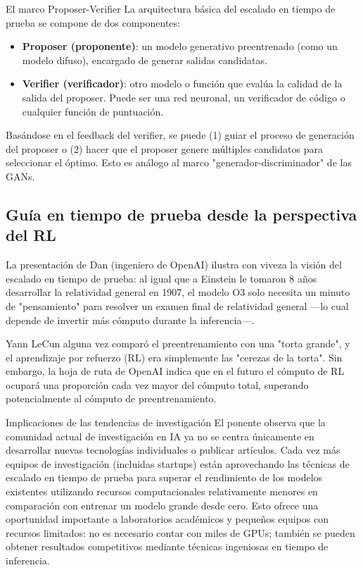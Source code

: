 \begin{importantbox}{El marco Proposer-Verifier}
La arquitectura básica del escalado en tiempo de prueba se compone de dos componentes:
\begin{itemize}
    \item \textbf{Proposer (proponente)}: un modelo generativo preentrenado (como un modelo difuso), encargado de generar salidas candidatas.
    \item \textbf{Verifier (verificador)}: otro modelo o función que evalúa la calidad de la salida del proposer. Puede ser una red neuronal, un verificador de código o cualquier función de puntuación.
\end{itemize}
Basándose en el feedback del verifier, se puede (1) guiar el proceso de generación del proposer o (2) hacer que el proposer genere múltiples candidatos para seleccionar el óptimo. Esto es análogo al marco "generador-discriminador" de las GANs.
\end{importantbox}

\subsection{Guía en tiempo de prueba desde la perspectiva del RL}

La presentación de Dan (ingeniero de OpenAI) ilustra con viveza la visión del escalado en tiempo de prueba: al igual que a Einstein le tomaron 8 años desarrollar la relatividad general en 1907, el modelo O3 solo necesita un minuto de "pensamiento" para resolver un examen final de relatividad general —lo cual depende de invertir más cómputo durante la inferencia—.

Yann LeCun alguna vez comparó el preentrenamiento con una "torta grande", y el aprendizaje por refuerzo (RL) era simplemente las "cerezas de la torta". Sin embargo, la hoja de ruta de OpenAI indica que en el futuro el cómputo de RL ocupará una proporción cada vez mayor del cómputo total, superando potencialmente al cómputo de preentrenamiento.

\begin{warningbox}{Implicaciones de las tendencias de investigación}
El ponente observa que la comunidad actual de investigación en IA ya no se centra únicamente en desarrollar nuevas tecnologías individuales o publicar artículos. Cada vez más equipos de investigación (incluidas startups) están aprovechando las técnicas de escalado en tiempo de prueba para superar el rendimiento de los modelos existentes utilizando recursos computacionales relativamente menores en comparación con entrenar un modelo grande desde cero. Esto ofrece una oportunidad importante a laboratorios académicos y pequeños equipos con recursos limitados: no es necesario contar con miles de GPUs; también se pueden obtener resultados competitivos mediante técnicas ingeniosas en tiempo de inferencia.
\end{warningbox}

